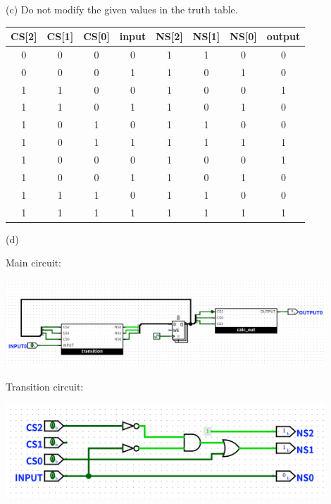 \documentclass[a4paper]{article}
\begin{document}
\begin{answer}[Question 3]
    (c) Do not modify the given values in the truth table.\\
    \begin{center}
        \begin{tabular}{ |c|c|c|c||c|c|c|c| } 
            \hline
            CS[2] & CS[1] & CS[0] & input & NS[2] & NS[1] & NS[0] & output \\ 
            \hline
            0 & 0 & 0 & 0 & 1 & 1 & 0 & 0 \\ 
            \hline
            0 & 0 & 0 & 1 & 1 & 0 & 1 & 0 \\ 
            \hline
            1 & 1 & 0 & 0 & 1 & 0 & 0 & 1 \\ 
            \hline
            1 & 1 & 0 & 1 & 1 & 0 & 1 & 0 \\ 
            \hline
            1 & 0 & 1 & 0 & 1 & 1 & 0 & 0 \\ 
            \hline
            1 & 0 & 1 & 1 & 1 & 1 & 1 & 1 \\ 
            \hline
            1 & 0 & 0 & 0 & 1 & 0 & 0 & 1 \\ 
            \hline
            1 & 0 & 0 & 1 & 1 & 0 & 1 & 0 \\ 
            \hline
            1 & 1 & 1 & 0 & 1 & 1 & 0 & 0 \\ 
            \hline
            1 & 1 & 1 & 1 & 1 & 1 & 1 & 1 \\ 
            \hline
        \end{tabular}
    \end{center}

    (d)

    Main circuit:
    \begin{center}
        \includegraphics[width=0.9\textwidth]{main.png}
    \end{center}

    \newpage

    Transition circuit:
    \begin{center}
        \includegraphics[width=0.9\textwidth]{transition.png}
    \end{center}


\end{answer}
\end{document}

